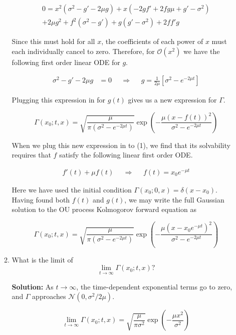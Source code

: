 \documentclass[12pt, a4paper]{article}
\begin{document}
\begin{enumerate}
\begin{enumerate}
        \begin{align*}
            0 = x^2 \left( \sigma^2 -g' -2\mu g \right) + x \left(-2gf' + 2fg\mu + g' - \sigma^2 \right)\\
            + 2\mu g^2 + f^2(\sigma^2-g') + g(g'-\sigma^2) + 2ff'g 
        \end{align*}

        Since this must hold for all $x$, the coefficients of each power of $x$ must each individually cancel to zero. Therefore, for $\mathcal O (x^2)$ we have the following first order linear ODE for $g$.

        \begin{align*}
            \sigma^2 - g' - 2\mu g &= 0 &&  \Rightarrow && g = \frac{1}{2\mu}[\sigma^2 - e^{-2\mu t}]
        \end{align*}

        Plugging this expression in for $g(t)$ gives us a new expression for $\Gamma$. 

        $$\Gamma(x_0;t,x) =  \sqrt{\frac{\mu}{\pi(\sigma^2-e^{-2\mu t})}} \exp\left(-\frac{\mu  (x-f(t))^2}{\sigma ^2-e^{-2 \mu  t}}\right)$$
        
        When we plug this new expression in to (1), we find that its solvability requires that $f$ satisfy the following linear first order ODE.

        \begin{align*}
            f'(t)+\mu  f(t) && \Rightarrow && f(t) = x_0 e^{-\mu t}
        \end{align*}

        Here we have used the initial condition $\Gamma(x_0; 0,x)=\delta(x-x_0)$. Having found both $f(t)$ and $g(t)$, we may write the full Gaussian solution to the OU process Kolmogorov forward equation as

        $$\Gamma(x_0; t,x) = \sqrt{\frac{\mu}{\pi(\sigma^2-e^{-2\mu t})}} \exp \left(-\frac{\mu  \left(x-x_0 e^{-\mu t}\right)^2}{\sigma ^2-e^{-2 \mu  t}}\right)$$


        \item What is the limit of $$\lim_{t\rightarrow \infty} \Gamma(x_0; t,x)?$$

        \textbf{Solution:} As $t\rightarrow \infty$, the time-dependent exponential terms go to zero, and $\Gamma$ approaches $\mathcal N(0, \sigma^2/2\mu)$.

        $$\lim_{t\rightarrow \infty} \Gamma(x_0;t,x) = \sqrt{\frac{\mu}{\pi \sigma^2}} \exp \left(- \frac{\mu x^2}{\sigma^2} \right)$$


\end{enumerate}
\end{enumerate}
\end{document}
